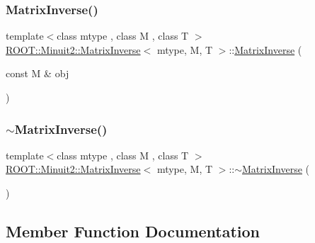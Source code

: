 \subsubsection{\texorpdfstring{MatrixInverse()}{MatrixInverse()}\hspace{0.1cm}{\footnotesize\ttfamily [2/2]}}
{\footnotesize\ttfamily template$<$class mtype , class M , class T $>$ \\
\mbox{\hyperlink{classROOT_1_1Minuit2_1_1MatrixInverse}{R\+O\+O\+T\+::\+Minuit2\+::\+Matrix\+Inverse}}$<$ mtype, M, T $>$\+::\mbox{\hyperlink{classROOT_1_1Minuit2_1_1MatrixInverse}{Matrix\+Inverse}} (\begin{DoxyParamCaption}\item[{const M \&}]{obj }\end{DoxyParamCaption})\hspace{0.3cm}{\ttfamily [inline]}}

\mbox{\label{classROOT_1_1Minuit2_1_1MatrixInverse_a190e28b4816e8bbce3fdd4b2122e89b4}} 
\subsubsection{\texorpdfstring{$\sim$MatrixInverse()}{~MatrixInverse()}\hspace{0.1cm}{\footnotesize\ttfamily [2/2]}}
{\footnotesize\ttfamily template$<$class mtype , class M , class T $>$ \\
\mbox{\hyperlink{classROOT_1_1Minuit2_1_1MatrixInverse}{R\+O\+O\+T\+::\+Minuit2\+::\+Matrix\+Inverse}}$<$ mtype, M, T $>$\+::$\sim$\mbox{\hyperlink{classROOT_1_1Minuit2_1_1MatrixInverse}{Matrix\+Inverse}} (\begin{DoxyParamCaption}{ }\end{DoxyParamCaption})\hspace{0.3cm}{\ttfamily [inline]}}



\subsection{Member Function Documentation}
\mbox{\label{classROOT_1_1Minuit2_1_1MatrixInverse_a189a8ae3c36a989a47758de7aee4e181}} 
